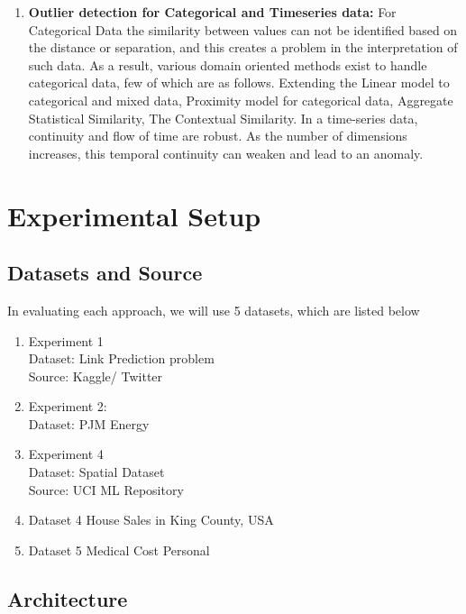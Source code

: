 \documentclass[runningheads]{llncs}
\begin{document}
\begin{enumerate}
    \item \textbf{Outlier detection for Categorical and Timeseries data:} For Categorical Data the similarity between values can not be identified based on the distance or separation, and this creates a problem in the interpretation of such data. As a result, various domain oriented methods exist to handle categorical data, few of which are as follows. Extending the Linear model to categorical and mixed data, Proximity model for categorical data, Aggregate Statistical Similarity, The Contextual Similarity. In a time-series data, continuity and flow of time are robust. As the number of dimensions increases, this temporal continuity can weaken and lead to an anomaly.
\end{enumerate}

\section{Experimental Setup}
\subsection{Datasets and Source}

In evaluating each approach, we will use 5 datasets, which are listed below
\begin{enumerate}
    \item Experiment 1 \\
    Dataset: Link Prediction problem \\
    Source: Kaggle/ Twitter
    \item Experiment 2: \\
    Dataset: PJM Energy
    \item Experiment 4 \\
    Dataset: Spatial Dataset \\
    Source: UCI ML Repository
    \item Dataset 4 House Sales in King County, USA \\
    \item Dataset 5 Medical Cost Personal \\
\end{enumerate}

\subsection{Architecture}
\end{document}
